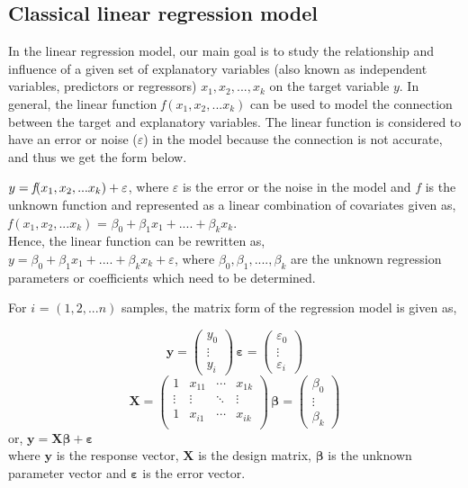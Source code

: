 \documentclass[12 pt]{scrartcl}
\begin{document}
\subsection{Classical linear regression model}

In the linear regression model, our main goal is to study the relationship and influence of a given set of explanatory variables (also known as independent variables, predictors or regressors) ${x_1, x_2,...,x_k}$ on the target variable ${y}$. In general, the linear function \emph{f$(x_1, x_2,...x_k)$} can be used to model the connection between the target and explanatory variables. The linear function is considered to have an error or noise ($\varepsilon$) in the model because the connection is not accurate, and thus we get the form below.

$y =  \emph{f$(x_1, x_2,...x_k)$} + \varepsilon$, where $\varepsilon$ is the error or the noise in the model and $f$ is the unknown function and represented as a linear combination of covariates given as, \emph{f$(x_1, x_2,...x_k)$} = ${\beta}_0 + {\beta}_1{x_{1}} + ....+ {\beta}_k{x_{k}}$.\\
Hence, the linear function can be rewritten as,\\
$y = {\beta}_0 + {\beta}_1{x_{1}} + ....+ {\beta}_k{x_{k}} + \varepsilon$, where ${\beta}_0, {\beta}_1 , ...., {\beta}_k$ are the unknown regression parameters or coefficients which need to be determined.

For $i$ = ${(1,2,...n)}$  samples, the matrix form of the regression model is given as,

\[
\textbf{y} = 
\begin{pmatrix}
{y_0}\\
\vdots\\
{y_i}
\end{pmatrix}
 \,
\boldsymbol{\varepsilon} =
\begin{pmatrix}
{\varepsilon_0}\\
\vdots\\
{\varepsilon_i}
\end{pmatrix}
\]
\[
\textbf{X} = 
\begin{pmatrix}
1 & {x_{11}} & {\cdots} & {x_{1k}}\\
\vdots & {\vdots} & {\ddots} & {\vdots}\\
1 & {x_{i1}} & {\cdots} & {x_{ik}}\\
\end{pmatrix}
 \,
\boldsymbol{\beta} =
\begin{pmatrix}
{\beta_0}\\
\vdots\\
{\beta_k}
\end{pmatrix}
\]
or, $ \textbf{y} = {\textbf{X}}{\boldsymbol{\beta}} + {\boldsymbol{\varepsilon}}$\\
where  $\textbf{y}$ is the response vector,
 $\textbf{X}$ is the design matrix,
${\boldsymbol{\beta}}$ is the unknown parameter vector and
${\boldsymbol{\varepsilon}}$ is the error vector.\citep[p.~73-75]{regression}
\end{document}

